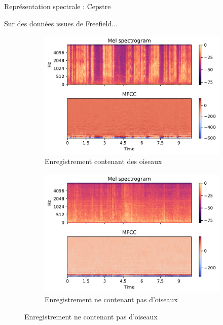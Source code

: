 \documentclass[compress,xcolor=table]{beamer}
\begin{document}
\begin{frame}{Représentation spectrale : Cepstre}

    Sur des données issues de Freefield...

    \begin{figure}[ht]
        \centering
        \begin{subfigure}[b]{0.45\textwidth}
            \centering
            \includegraphics[width=\textwidth]{../images/audio/birds.mfcc.ff1010.pdf}
            \caption{Enregistrement contenant des oiseaux}
            \label{fig:birds.mfcc.ff1010}
        \end{subfigure}
        \hfill
        \begin{subfigure}[b]{0.45\textwidth}
            \centering
            \includegraphics[width=\textwidth]{../images/audio/nobirds.mfcc.ff1010.pdf}
            \caption{Enregistrement ne contenant pas d'oiseaux}
            \label{fig:nobirds.mfcc.ff1010}
        \end{subfigure}
    \end{figure}

\end{frame}
\end{document}
